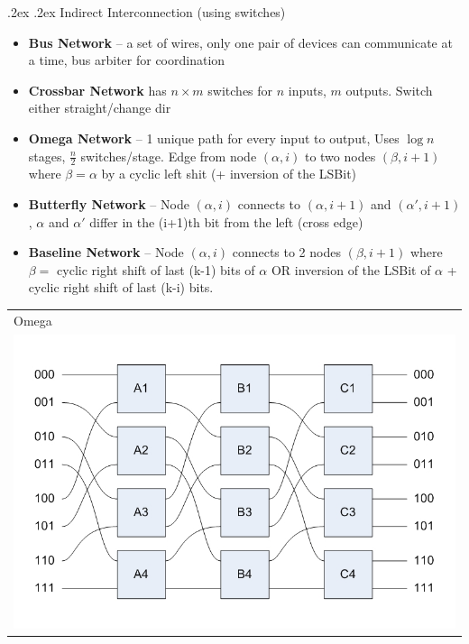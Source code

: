 \documentclass[10pt,landscape,a4paper]{article}
\makeatletter
\renewcommand{\subsubsection}{\@startsection{subsubsection}{1}{0mm}%
  {.2ex}%
  {.2ex}%
{\rmfamily\bfseries}}
\makeatother
\begin{document}
\begin{multicols*}{4}
  \subsubsection{Indirect Interconnection (using switches)}
  \begin{itemize}
    \item \textbf{Bus Network} -- a set of wires, only one pair of devices can communicate at a time, bus arbiter for coordination
    \item \textbf{Crossbar Network} has $n\times m$ switches for $n$ inputs, $m$ outputs. Switch either straight/change dir
    \item \textbf{Omega Network} -- 1 unique path for every input to output, Uses $\log n$ stages, $\frac{n}{2}$ switches/stage. Edge from node $(\alpha, i)$ to two nodes $(\beta, i + 1)$ where $\beta = \alpha$ by a cyclic left shit (+ inversion of the LSBit)
    \item \textbf{Butterfly Network} -- Node $(\alpha, i)$ connects to $(\alpha, i + 1)$ and $(\alpha', i + 1)$, $\alpha$ and $\alpha'$ differ in the (i+1)th bit from the left (cross edge)
    \item \textbf{Baseline Network} -- Node $(\alpha, i)$ connects to 2 nodes $(\beta, i + 1)$ where $\beta = $ cyclic right shift of last (k-1) bits of $\alpha$ OR inversion of the LSBit of $\alpha$ + cyclic right shift of last (k-i) bits.
  \end{itemize}
  \begin{tabularx}{0.32\linewidth}{X}
    Omega \\
    \includegraphics[width=\linewidth]{omega}
  \end{tabularx}
  \begin{tabularx}{0.32\linewidth}{X}

\end{tabularx}
\end{multicols*}
\end{document}
